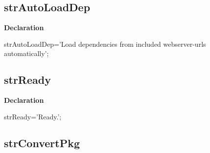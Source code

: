 \documentclass{report}
\newif\ifpdf
\begin{document}
\subsection*{strAutoLoadDep}
\fi
\label{trstrings-strAutoLoadDep}
\begin{list}{}{
\setlength{\itemindent}{0cm}
\setlength{\listparindent}{0cm}
\setlength{\leftmargin}{\evensidemargin}
\addtolength{\leftmargin}{\tmplength}
\settowidth{\labelsep}{X}
\addtolength{\leftmargin}{\labelsep}
\setlength{\labelwidth}{\tmplength}
}
\item[\textbf{Declaration}\hfill]
\ifpdf
\begin{flushleft}
\fi
\begin{ttfamily}
strAutoLoadDep='Load dependencies from included webserver-urls automatically';\end{ttfamily}

\ifpdf
\end{flushleft}
\fi

\end{list}
\ifpdf
\subsection*{\large{\textbf{strReady}}\normalsize\hspace{1ex}\hrulefill}
\else
\subsection*{strReady}
\fi
\label{trstrings-strReady}
\begin{list}{}{
\setlength{\itemindent}{0cm}
\setlength{\listparindent}{0cm}
\setlength{\leftmargin}{\evensidemargin}
\addtolength{\leftmargin}{\tmplength}
\settowidth{\labelsep}{X}
\addtolength{\leftmargin}{\labelsep}
\setlength{\labelwidth}{\tmplength}
}
\item[\textbf{Declaration}\hfill]
\ifpdf
\begin{flushleft}
\fi
\begin{ttfamily}
strReady='Ready.';\end{ttfamily}

\ifpdf
\end{flushleft}
\fi

\end{list}
\ifpdf
\subsection*{\large{\textbf{strConvertPkg}}\normalsize\hspace{1ex}\hrulefill}
\else
\end{document}
